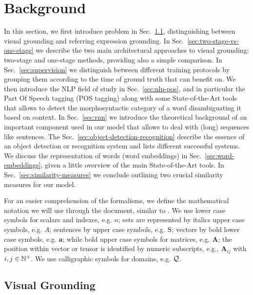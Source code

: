 
\chapter{Background}
\label{ch:background}

In this section, we first introduce problem in
Sec.~\ref{sec:visual-grounding}, distinguishing between visual
grounding and referring expression grounding. In
Sec.~\ref{sec:two-stage-vs-one-stage} we describe the two main
architectural approaches to visual grounding: two-stage and one-stage
methods, providing also a simple comparison. In
Sec.~\ref{sec:supervision} we distinguish between different training
protocols by grouping them according to the time of ground truth that
can benefit on. We then introduce the NLP field of study in
Sec.~\ref{sec:nlp-pos}, and in particular the Part Of Speech tagging
(POS tagging) along with some State-of-the-Art tools that allows to
detect the morphosyntactic category of a word disambiguating it based
on context. In Sec.~\ref{sec:rnn} we introduce the theoretical
background of an important component used in our model that allows to
deal with (long) sequences like sentences. The
Sec.~\ref{sec:object-detection-recognition} describe the essence of an
object detection or recognition system and lists different successful
systems. We discuss the representation of words (word embeddings) in
Sec.~\ref{sec:word-embeddings}, given a little overview of the main
State-of-the-Art tools. In Sec.~\ref{sec:similarity-measures} we
conclude outlining two crucial similarity measures for our model.

 For an easier comprehension of the formalisms,
we define the mathematical notation we will use through the document,
similar to \cite{rigoni2021better}. We use lower case symbols for
scalars and indexes, e.g. $n$; sets are represented by italics upper
case symbols, e.g. $A$; sentences by upper case symbols, e.g. $\mathrm{S}$;
vectors by bold lower case symbols, e.g. $\bm{a}$; while bold upper
case symbols for matrices, e.g. $\bm{A}$; the position within vector
or tensor is identified by numeric subscripts, e.g., $\bm{A}_{ij}$
with $i, j \in \mathbb{N}^+$. We use calligraphic symbols for domains, e.g.
$\mathcal{Q}$.

\section{Visual Grounding}
\label{sec:visual-grounding}

